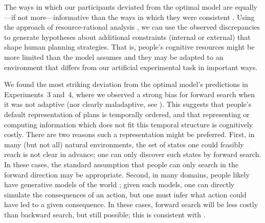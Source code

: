 The ways in which our participants deviated from the optimal model are equally---if not more---informative than the ways in which they were consistent \citep{norris2021more}. Using the approach of resource-rational analysis \citep{griffiths2015rational,lieder2020resourcerational}, we can use the observed discrepancies to generate hypotheses about additional constraints (internal or external) that shape human planning strategies. That is, people's cognitive resources might be more limited than the model assumes and they may be adapted to an environment that differs from our artificial experimental task in important ways.

We found the most striking deviation from the optimal model's predictions in Experiments~3 and~4, where we observed a strong bias for forward search when it was not adaptive (nor clearly maladaptive, see ). 
This suggests that people's default representation of plans is temporally ordered, and that representing or computing information which does not fit this temporal structure is cognitively costly.
There are two reasons such a representation might be preferred.
First, in many (but not all) natural environments, the set of states one could feasibly reach is not clear in advance; one can only discover such states by forward search. In these cases, the standard assumption that people can only search in the forward direction \citep{keramati2016adaptive,vanopheusden2017computational,huys2012bonsai,snider2015prospective} may be appropriate. Second, in many domains, people likely have generative models of the world \citep{battaglia2013simulation,jara-ettinger2016naive}; given such models, one can directly simulate the consequences of an action, but one must infer what action could have led to a given consequence. In these cases, forward search will be less costly than backward search, but still possible; this is consistent with .


